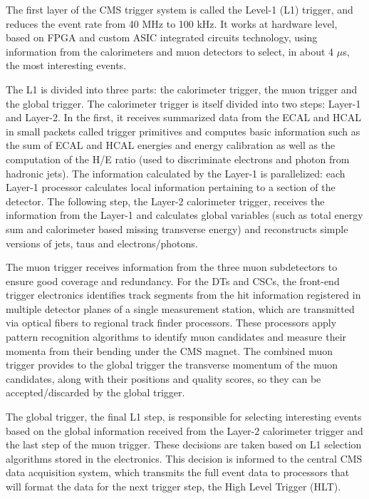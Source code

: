 The first layer of the CMS trigger system is called the Level-1 (L1) trigger, and reduces the event rate from 40 MHz to 100 kHz. 
It works at hardware level, based on FPGA and custom ASIC integrated circuits technology, using information from the calorimeters and muon detectors to select, in about 4 $\mu$s, the most interesting events. 

The L1 is divided into three parts: the calorimeter trigger, the muon trigger and the global trigger.
The calorimeter trigger is itself divided into two steps: Layer-1 and Layer-2. 
In the first, it receives summarized data from the ECAL and HCAL in small packets called trigger primitives and computes basic information such as the sum of ECAL and HCAL energies and energy calibration as well as the computation of the H/E ratio (used to discriminate electrons and photon from hadronic jets). 
The information calculated by the Layer-1 is parallelized: each Layer-1 processor calculates local information pertaining to a section of the detector. 
The following step, the Layer-2 calorimeter trigger, receives the information from the Layer-1 and calculates global variables (such as total energy sum and calorimeter based missing transverse energy) and reconstructs simple versions of jets, taus and electrons/photons. 

The muon trigger receives information from the three muon subdetectors to ensure good coverage and redundancy. 
For the DTs and CSCs, the front-end trigger electronics identifies track segments from the hit information registered in multiple detector planes of a single measurement station, which are transmitted via optical fibers to regional track finder processors. 
These processors apply pattern recognition algorithms to identify muon candidates and measure their momenta from their bending under the CMS magnet. 
The combined muon trigger provides to the global trigger the transverse momentum of the muon candidates, along with their positions and quality scores, so they can be accepted/discarded by the global trigger. 

The global trigger, the final L1 step, is responsible for selecting interesting events based on the global information received from the Layer-2 calorimeter trigger and the last step of the muon trigger. 
These decisions are taken based on L1 selection algorithms stored in the electronics. 
This decision is informed to the central CMS data acquisition system, which transmits the full event data to processors that will format the data for the next trigger step, the High Level Trigger (HLT). 


